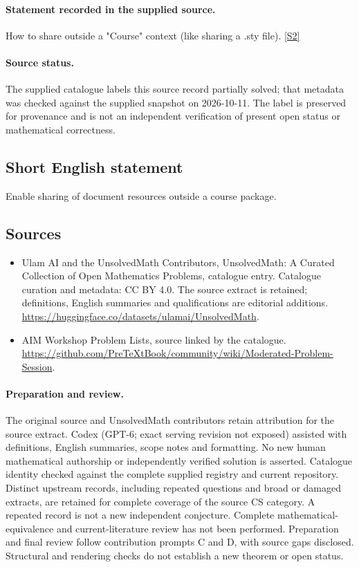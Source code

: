 \documentclass[11pt]{article}
\begin{document}
\paragraph{Statement recorded in the supplied source.}
How to share outside a "Course" context (like sharing a .sty file). \href{https://github.com/PreTeXtBook/community/wiki/Moderated-Problem-Session}{[S2]}
\paragraph{Source status.}
The supplied catalogue labels this source record partially solved; that metadata was checked against the supplied snapshot on 2026-10-11. The label is preserved for provenance and is not an independent verification of present open status or mathematical correctness.
\subsection{Short English statement}
Enable sharing of document resources outside a course package.
\subsection{Sources}
\begin{itemize}
\item[S1] Ulam AI and the UnsolvedMath Contributors, UnsolvedMath: A Curated Collection of Open Mathematics Problems, catalogue entry. Catalogue curation and metadata: CC BY 4.0. The source extract is retained; definitions, English summaries and qualifications are editorial additions.
\url{https://huggingface.co/datasets/ulamai/UnsolvedMath}.
\item[S2] AIM Workshop Problem Lists, source linked by the catalogue.
\url{https://github.com/PreTeXtBook/community/wiki/Moderated-Problem-Session}.
\end{itemize}
\paragraph{Preparation and review.}
The original source and UnsolvedMath contributors retain attribution for the source extract. Codex (GPT-6; exact serving revision not exposed) assisted with definitions, English summaries, scope notes and formatting. No new human mathematical authorship or independently verified solution is asserted. Catalogue identity checked against the complete supplied registry and current repository. Distinct upstream records, including repeated questions and broad or damaged extracts, are retained for complete coverage of the source CS category. A repeated record is not a new independent conjecture. Complete mathematical-equivalence and current-literature review has not been performed. Preparation and final review follow contribution prompts C and D, with source gaps disclosed. Structural and rendering checks do not establish a new theorem or open status.
\label{end:statement}
\end{document}
